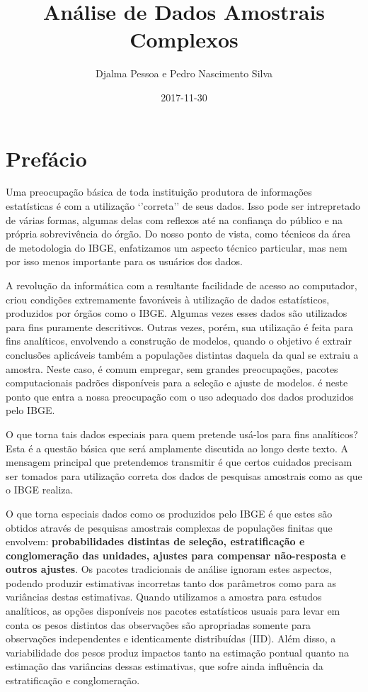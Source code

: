 \documentclass[]{book}
\title{Análise de Dados Amostrais Complexos}
\author{Djalma Pessoa e Pedro Nascimento Silva}
\date{2017-11-30}
\theoremstyle{definition}
\theoremstyle{definition}
\theoremstyle{definition}
\theoremstyle{remark}
\begin{document}
\maketitle

{
\setcounter{tocdepth}{1}
\tableofcontents
}
\chapter*{Prefácio}\label{prefacio}

Uma preocupação básica de toda instituição produtora de informações
estatísticas é com a utilização `'correta'' de seus dados. Isso pode ser
intrepretado de várias formas, algumas delas com reflexos até na
confiança do público e na própria sobrevivência do órgão. Do nosso ponto
de vista, como técnicos da área de metodologia do IBGE, enfatizamos um
aspecto técnico particular, mas nem por isso menos importante para os
usuários dos dados.

A revolução da informática com a resultante facilidade de acesso ao
computador, criou condições extremamente favoráveis à utilização de
dados estatísticos, produzidos por órgãos como o IBGE. Algumas vezes
esses dados são utilizados para fins puramente descritivos. Outras
vezes, porém, sua utilização é feita para fins analíticos, envolvendo a
construção de modelos, quando o objetivo é extrair conclusões aplicáveis
também a populações distintas daquela da qual se extraiu a amostra.
Neste caso, é comum empregar, sem grandes preocupações, pacotes
computacionais padrões disponíveis para a seleção e ajuste de modelos. é
neste ponto que entra a nossa preocupação com o uso adequado dos dados
produzidos pelo IBGE.

O que torna tais dados especiais para quem pretende usá-los para fins
analíticos? Esta é a questão básica que será amplamente discutida ao
longo deste texto. A mensagem principal que pretendemos transmitir é que
certos cuidados precisam ser tomados para utilização correta dos dados
de pesquisas amostrais como as que o IBGE realiza.

O que torna especiais dados como os produzidos pelo IBGE é que estes são
obtidos através de pesquisas amostrais complexas de populações finitas
que envolvem: \textbf{probabilidades distintas de seleção,
estratificação e conglomeração das unidades, ajustes para compensar
não-resposta e outros ajustes}. Os pacotes tradicionais de análise
ignoram estes aspectos, podendo produzir estimativas incorretas tanto
dos parâmetros como para as variâncias destas estimativas. Quando
utilizamos a amostra para estudos analíticos, as opções disponíveis nos
pacotes estatísticos usuais para levar em conta os pesos distintos das
observações são apropriadas somente para observações independentes e
identicamente distribuídas (IID). Além disso, a variabilidade dos pesos
produz impactos tanto na estimação pontual quanto na estimação das
variâncias dessas estimativas, que sofre ainda influência da
estratificação e conglomeração.
\end{document}
